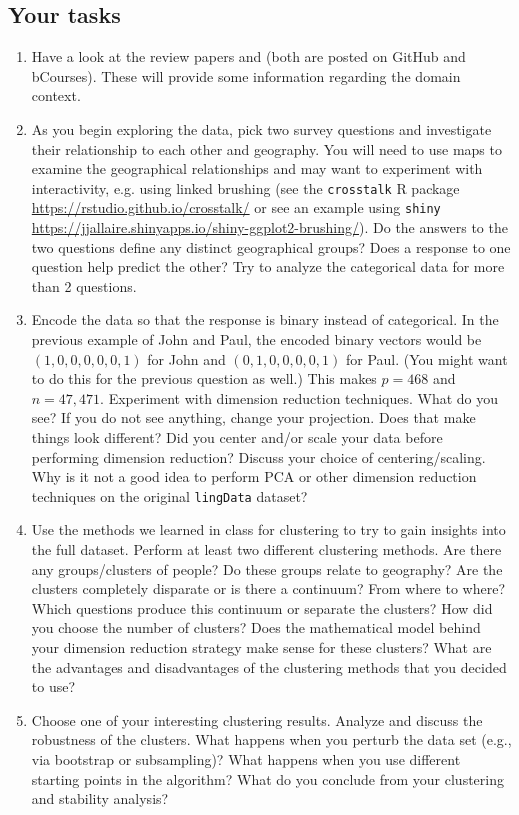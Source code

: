\documentclass[english]{article}\usepackage[]{graphicx}\usepackage[]{color}
\numberwithin{equation}{section}
\numberwithin{figure}{section}
\begin{document}
\subsection{Your tasks}
\begin{enumerate}
\item Have a look at the review papers \citet{nerbonne2003introducing}
and \citet{nerbonne2006progress} (both are posted on GitHub and bCourses). These will provide some information regarding the domain context.
\item As you begin exploring the data, pick two survey questions and investigate their relationship to each other and geography. You will need to use maps to examine the geographical relationships and may want to experiment with interactivity, e.g. using linked brushing (see the \texttt{crosstalk} R package \url{https://rstudio.github.io/crosstalk/} or see an example using \texttt{shiny} \url{https://jjallaire.shinyapps.io/shiny-ggplot2-brushing/}). Do the answers to the two questions define any distinct geographical groups? Does a response to one question help predict the other? Try to analyze the categorical data for more than 2 questions.
\item Encode the data so that the response is binary instead of categorical. In the previous example of John and Paul, the encoded binary vectors would be $(1,0,0,0,0,0,1)$ for John and $(0,1,0,0,0,0,1)$ for Paul. (You might want to do this for the previous question as well.) This makes $p=468$ and $n=47,471$. Experiment with dimension reduction techniques. What do you see? If you do not see anything, change your projection. Does that make things look different? Did you center and/or scale your data before performing dimension reduction? Discuss your choice of centering/scaling. Why is it not a good idea to perform PCA or other dimension reduction techniques on the original \texttt{lingData} dataset?
\item Use the methods we learned in class for clustering to try to gain insights into the full dataset. Perform at least two different clustering methods. Are there any groups/clusters of people? Do these groups relate to geography? Are the clusters completely disparate or is there a continuum? From where to where? Which questions produce this continuum or separate the clusters? How did you choose the number of clusters? Does the mathematical model behind your dimension reduction strategy make sense for these clusters? What are the advantages and disadvantages of the clustering methods that you decided to use?
\item Choose one of your interesting clustering results. Analyze and discuss the robustness of the clusters. What happens when you perturb the data set (e.g., via bootstrap or subsampling)? What happens when you use different starting points in the algorithm? What do you conclude from your clustering and stability analysis?
\end{enumerate}


\end{document}
